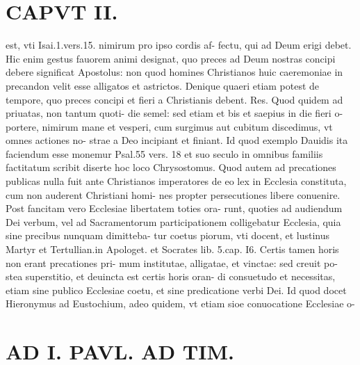 \documentclass{article}
\begin{document}
\begin{pages}
\section*{CAPVT  II. }
\marginpar{[ p.75 ]}\pstart est, vti Isai.1.vers.15. nimirum pro ipso cordis af- fectu, qui ad Deum erigi debet. Hic enim gestus fauorem animi designat, quo preces ad Deum nostras concipi debere significat Apostolus: non quod homines Christianos huic caeremoniae in precandon velit esse alligatos et astrictos. Denique quaeri etiam potest de tempore, quo preces concipi et fieri a Christianis debent. Res. Quod quidem ad priuatas, non tantum quoti- die semel: sed etiam et bis et saepius in die fieri o- portere, nimirum mane et vesperi, cum surgimus aut cubitum discedimus, vt omnes actiones no- strae a Deo incipiant et finiant. Id quod exemplo Dauidis ita faciendum esse monemur Psal.55 vers. 18 et suo seculo in omnibus familiis factitatum scribit diserte hoc loco Chrysostomus. Quod autem ad precationes publicas nulla fuit ante Christianos imperatores de eo lex in Ecclesia constituta, cum non auderent Christiani homi- nes propter persecutiones libere conuenire. Post fancitam vero Ecclesiae libertatem toties ora- runt, quoties ad audiendum Dei verbum, vel ad Sacramentorum participationem colligebatur Ecclesia, quia sine precibus nunquam dimitteba- tur coetus piorum, vti docent, et lustinus Martyr et Tertullian.in Apologet. et Socrates lib. 5.cap. I6. Certis tamen horis non erant precationes pri- mum institutae, alligatae, et vinctae: sed creuit po- stea superstitio, et deuincta est certis horis oran- di consuetudo et necessitas, etiam sine publico Ecclesiae coetu, et sine predicatione verbi Dei. Id quod docet Hieronymus ad Eustochium, adeo quidem, vt etiam sioe conuocatione Ecclesiae o-  \pend
\section*{AD I. PAVL. AD TIM. }
\marginpar{[ p.76 ]}\pstart {}
{}

\end{pages}
\end{document}

